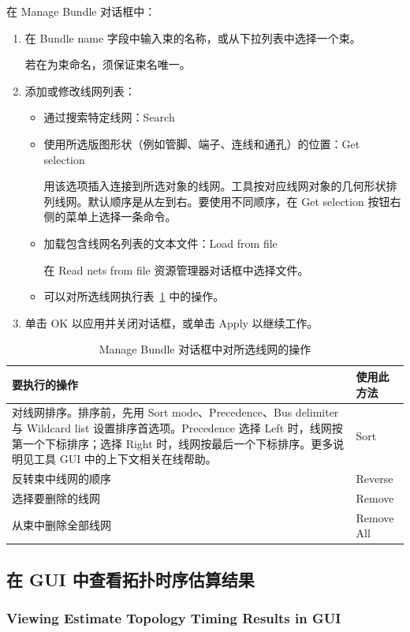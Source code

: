 在 Manage Bundle 对话框中：
\begin{enumerate}
  \item 在 Bundle name 字段中输入束的名称，或从下拉列表中选择一个束。

  若在为束命名，须保证束名唯一。
  \item 添加或修改线网列表：
  \begin{itemize}
    \item 通过搜索特定线网：Search
    \item 使用所选版图形状（例如管脚、端子、连线和通孔）的位置：Get selection

    用该选项插入连接到所选对象的线网。工具按对应线网对象的几何形状排列线网。默认顺序是从左到右。要使用不同顺序，在 Get selection 按钮右侧的菜单上选择一条命令。
    \item 加载包含线网名列表的文本文件：Load from file

    在 Read nets from file 资源管理器对话框中选择文件。
    \item 可以对所选线网执行表~\ref{tab:gui-dp-bundle} 中的操作。
  \end{itemize}
  \item 单击 OK 以应用并关闭对话框，或单击 Apply 以继续工作。
\end{enumerate}

\begin{table}[htbp]
\centering
\caption{Manage Bundle 对话框中对所选线网的操作}
\label{tab:gui-dp-bundle}
\begin{tabularx}{\textwidth}{@{}X l@{}}
\toprule
要执行的操作 & 使用此方法 \\
\midrule
对线网排序。排序前，先用 Sort mode、Precedence、Bus delimiter 与 Wildcard list 设置排序首选项。Precedence 选择 Left 时，线网按第一个下标排序；选择 Right 时，线网按最后一个下标排序。更多说明见工具 GUI 中的上下文相关在线帮助。 & Sort \\
\addlinespace
反转束中线网的顺序 & Reverse \\
\addlinespace
选择要删除的线网 & Remove \\
\addlinespace
从束中删除全部线网 & Remove All \\
\bottomrule
\end{tabularx}
\end{table}

\subsection{在 GUI 中查看拓扑时序估算结果}
\subsubsection*{Viewing Estimate Topology Timing Results in GUI}

